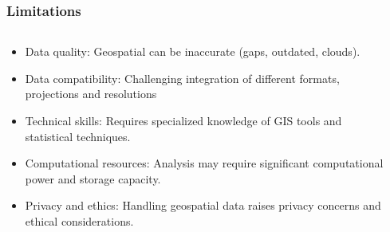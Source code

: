 \documentclass[xcolor=x11names,compress]{beamer}
\renewcommand{\(}{\begin{columns}}
\renewcommand{\)}{\end{columns}}
\newcommand{\<}[1]{\begin{column}{#1}}
\renewcommand{\>}{\end{column}}
\begin{document}
\begin{frame}
\begin{columns}[T]
\begin{column}{0.4\textwidth}
\begin{itemize}
        \end{itemize}
        \end{column}
    \end{columns}
\end{frame}


\begin{frame}
    \frametitle{Limitations}
    \begin{columns}[T]
        \begin{column}{0.7\textwidth}
            \begin{itemize}[<+->]
                \item Data quality: Geospatial can be inaccurate (gaps, outdated, clouds).
                \item Data compatibility: Challenging  integration of different formats, projections and resolutions
                \item Technical skills: Requires specialized knowledge of GIS tools and statistical techniques.
                \item Computational resources: Analysis may require significant computational power and storage capacity.
                \item Privacy and ethics: Handling geospatial data raises privacy concerns and ethical considerations.
            \end{itemize}
        \end{column}
        \begin{column}{0.3\textwidth}

\end{column}
\end{columns}
\end{frame}
\end{document}
